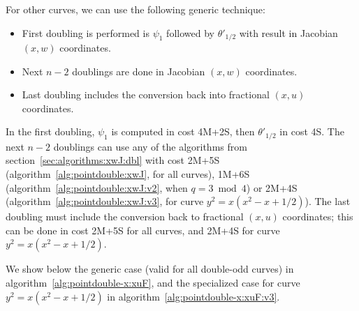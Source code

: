 \documentclass{llncs}
\begin{document}
For other curves, we can use the following generic technique:
\begin{itemize}
    \item First doubling is performed is $\psi_1$ followed by
    $\theta'_{1/2}$ with result in Jacobian $(x,w)$ coordinates.
    \item Next $n-2$ doublings are done in Jacobian $(x,w)$ coordinates.
    \item Last doubling includes the conversion back into fractional
    $(x,u)$ coordinates.
\end{itemize}
In the first doubling, $\psi_1$ is computed in cost 4M+2S, then
$\theta'_{1/2}$ in cost 4S. The next $n-2$ doublings can use any of the
algorithms from section~\ref{sec:algorithms:xwJ:dbl} with cost 2M+5S
(algorithm~\ref{alg:pointdouble:xwJ}, for all curves), 1M+6S
(algorithm~\ref{alg:pointdouble:xwJ:v2}, when $q = 3\bmod 4$) or 2M+4S
(algorithm~\ref{alg:pointdouble:xwJ:v3}, for curve $y^2 = x(x^2 - x +
1/2)$). The last doubling must include the conversion back to fractional
$(x,u)$ coordinates; this can be done in cost 2M+5S for all curves, and
2M+4S for curve $y^2 = x(x^2 - x + 1/2)$.

We show below the generic case (valid for all double-odd curves) in
algorithm~\ref{alg:pointdouble-x:xuF}, and the specialized case for
curve $y^2 = x(x^2 - x + 1/2)$ in algorithm~\ref{alg:pointdouble-x:xuF:v3}.
\end{document}
